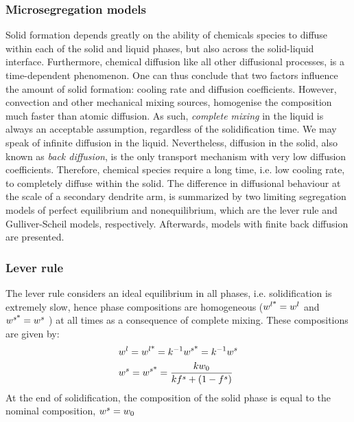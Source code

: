 \subsubsection{Microsegregation models}
Solid formation depends greatly on the ability of chemicals species to diffuse within each of 
the solid and liquid phases, but also across the solid-liquid interface. Furthermore, chemical diffusion like all other 
diffusional processes, is a time-dependent phenomenon. One can thus conclude that two factors
influence the amount of solid formation: cooling rate and diffusion coefficients. However, 
convection and other mechanical mixing sources, homogenise the composition much faster than atomic diffusion. 
As such, \emph{complete mixing} in the liquid is always an acceptable assumption, regardless of the 
solidification time. We may speak of infinite diffusion in the liquid. Nevertheless, diffusion in the solid, 
also known as \emph{back diffusion}, is the only transport mechanism with very low diffusion coefficients. 
Therefore, chemical species require a long time, i.e. low cooling rate, to completely diffuse within the solid.
The difference in diffusional behaviour at the scale of a secondary dendrite arm, is summarized by two limiting 
segregation models of perfect equilibrium  and nonequilibrium, which are the lever rule and Gulliver-Scheil models, respectively. 
Afterwards, models with finite back diffusion are presented. 
%
\subsubsection*{Lever rule}
The lever rule considers an ideal equilibrium in all phases, i.e. solidification is extremely slow, hence phase compositions are 
homogeneous ($ {w}^{l \text{*}}  = {w}^l$ and $ {w}^{s \text{*}}  = {w}^s$ ) at all times as a consequence of complete mixing. 
These compositions are given by:
\begin{align}
\label{eq:leverrule}
& {w}^l= {w}^{l \text{*}}  = k^{-1} {w}^{s \text{*}}  = k^{-1} {w}^s \\
& {w}^s= {w}^{s \text{*}}  = \frac{k {w}_0}{k{f^s} + (1-{f^s})}
\end{align}
At the end of solidification, the composition of the solid phase is equal to the nominal composition, ${w}^s = {w}_0$
%
